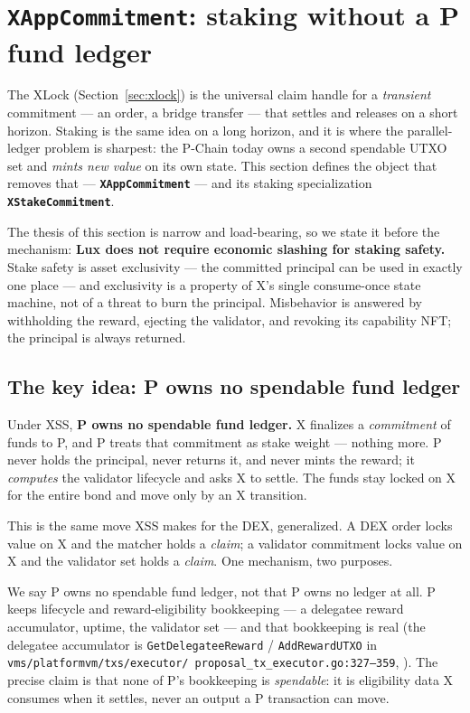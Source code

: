 \section{\texttt{XAppCommitment}: staking without a P fund ledger}
\label{sec:xappcommitment}

The XLock (Section~\ref{sec:xlock}) is the universal claim handle for a
\emph{transient} commitment --- an order, a bridge transfer --- that
settles and releases on a short horizon. Staking is the same idea on a
long horizon, and it is where the parallel-ledger problem is sharpest:
the P-Chain today owns a second spendable UTXO set and \emph{mints new
value} on its own state. This section defines the object that removes
that --- \textbf{\texttt{XAppCommitment}} --- and its staking
specialization \textbf{\texttt{XStakeCommitment}}.

The thesis of this section is narrow and load-bearing, so we state it
before the mechanism: \textbf{Lux does not require economic slashing for
staking safety.} Stake safety is asset exclusivity --- the committed
principal can be used in exactly one place --- and exclusivity is a
property of X's single consume-once state machine, not of a threat to
burn the principal. Misbehavior is answered by withholding the reward,
ejecting the validator, and revoking its capability NFT; the principal
is always returned.

\subsection{The key idea: P owns no spendable fund ledger}

Under XSS, \textbf{P owns no spendable fund ledger.} X finalizes a
\emph{commitment} of funds to P, and P treats that commitment as stake
weight --- nothing more. P never holds the principal, never returns it,
and never mints the reward; it \emph{computes} the validator lifecycle
and asks X to settle. The funds stay locked on X for the entire bond and
move only by an X transition.

This is the same move XSS makes for the DEX, generalized. A DEX order
locks value on X and the matcher holds a \emph{claim}; a validator
commitment locks value on X and the validator set holds a \emph{claim}.
One mechanism, two purposes.

We say P owns no spendable fund ledger, not that P owns no ledger at all.
P keeps lifecycle and reward-eligibility bookkeeping --- a delegatee
reward accumulator, uptime, the validator set --- and that bookkeeping
is real (the delegatee accumulator is \texttt{GetDelegateeReward} /
\texttt{AddRewardUTXO} in \texttt{vms/platformvm/txs/executor/\allowbreak
proposal\_tx\_executor.go:327--359}, \IMPL{}). The precise claim is that
none of P's bookkeeping is \emph{spendable}: it is eligibility data X
consumes when it settles, never an output a P transaction can move.

